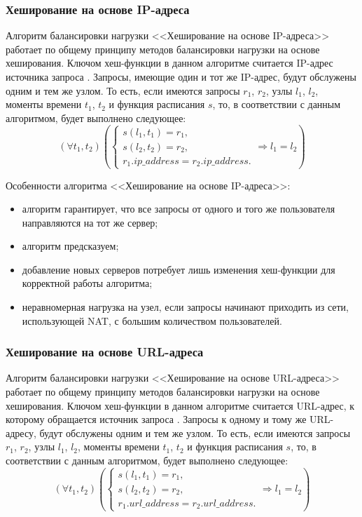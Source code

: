 \subsubsection*{Хеширование на основе IP-адреса}

Алгоритм балансировки нагрузки <<Хеширование на основе IP-адреса>> работает по общему принципу методов балансировки нагрузки на основе хеширования.
Ключом хеш-функции в данном алгоритме считается IP-адрес источника запроса \cite{nginx, aws, kemp}.
Запросы, имеющие один и тот же IP-адрес, будут обслужены одним и тем же узлом.
То есть, если имеются запросы $r_1$, $r_2$, узлы $l_1$, $l_2$, моменты времени $t_1$, $t_2$ и функция расписания $s$, то, в соответствии с данным алгоритмом, будет выполнено следующее:
\begin{equation}
	(\forall t_1, t_2) \left(\begin{cases}
		s(l_1, t_1) = r_1, \\
		s(l_2, t_2) = r_2, \\
		r_1.ip\_address = r_2.ip\_address.
	\end{cases} \Rightarrow l_1 = l_2 \right)
\end{equation}

Особенности алгоритма <<Хеширование на основе IP-адреса>>:
\begin{itemize}
	\item алгоритм гарантирует, что все запросы от одного и того же пользователя направляются на тот же сервер;
	\item алгоритм предсказуем;
	\item добавление новых серверов потребует лишь изменения хеш-функции для корректной работы алгоритма;
	\item неравномерная нагрузка на узел, если запросы начинают приходить из сети, использующей NAT, с большим количеством пользователей.
\end{itemize}

\subsubsection*{Хеширование на основе URL-адреса}

Алгоритм балансировки нагрузки <<Хеширование на основе URL-адреса>> работает по общему принципу методов балансировки нагрузки на основе хеширования.
Ключом хеш-функции в данном алгоритме считается URL-адрес, к которому обращается источник запроса \cite{nginx, kemp, haproxy}.
Запросы к одному и тому же URL-адресу, будут обслужены одним и тем же узлом.
То есть, если имеются запросы $r_1$, $r_2$, узлы $l_1$, $l_2$, моменты времени $t_1$, $t_2$ и функция расписания $s$, то, в соответствии с данным алгоритмом, будет выполнено следующее:
\begin{equation}
	(\forall t_1, t_2) \left(\begin{cases}
		s(l_1, t_1) = r_1, \\
		s(l_2, t_2) = r_2, \\
		r_1.url\_address = r_2.url\_address.
	\end{cases} \Rightarrow l_1 = l_2 \right)
\end{equation}

